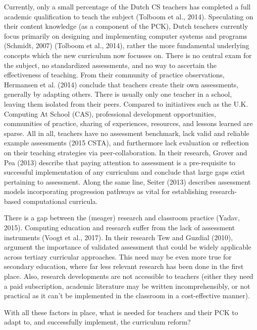 Currently, only a small percentage of the Dutch CS teachers has completed a full academic qualification to teach the subject (Tolboom et al., 2014). Speculating on their content knowledge (as a component of the PCK), Dutch teachers currently focus primarily on designing and implementing computer systems and programs (Schmidt, 2007) (Tolboom et al., 2014), rather the more fundamental underlying concepts which the new curriculum now focusses on. There is no central exam for the subject, no standardized assessments, and no way to ascertain the effectiveness of teaching. From their community of practice observations, Hermansen et al. (2014) conclude that teachers create their own assessments, generally by adapting others. There is usually only one teacher in a school, leaving them isolated from their peers. Compared to initiatives such as the U.K. Computing At School (CAS), professional development opportunities, communities of practice, sharing of experiences, resources, and lessons learned are sparse. All in all, teachers have no assessment benchmark, lack valid and reliable example assessments (2015 CSTA), and furthermore lack evaluation or reflection on their teaching strategies via peer-collaboration. In their research, Grover and Pea (2013) describe that paying attention to assessment is a pre-requisite to successful implementation of any curriculum and conclude that large gaps exist pertaining to assessment. Along the same line, Seiter (2013) describes assessment models incorporating progression pathways as vital for establishing research-based computational curricula.


There is a gap between the (meager) research and classroom practice (Yadav, 2015).  Computing education and research suffer from the lack of assessment instruments (Voogt et al., 2017). In their research Tew and Guzdial (2010), argument the importance of validated assessment that could be widely applicable across tertiary curricular approaches. This need may be even more true for secondary education, where far less relevant research has been done in the first place. Also, research developments are not accessible to teachers (either they need a paid subscription, academic literature may be written incomprehensibly, or not practical as it can't be implemented in the classroom in a cost-effective manner).

With all these factors in place, what is needed for teachers and their PCK to adapt to, and successfully implement, the curriculum reform?





